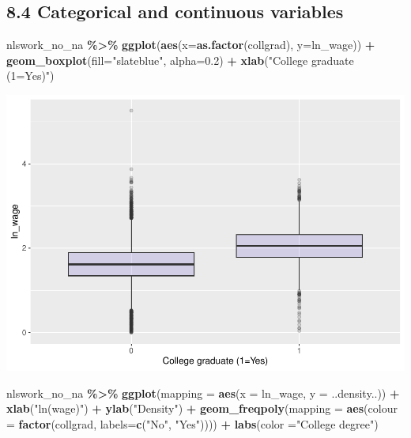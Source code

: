 \documentclass[
]{article}
\newenvironment{Shaded}{\begin{snugshade}}{\end{snugshade}}
\newcommand{\AttributeTok}[1]{\textcolor[rgb]{0.13,0.29,0.53}{#1}}
\newcommand{\FloatTok}[1]{\textcolor[rgb]{0.00,0.00,0.81}{#1}}
\newcommand{\FunctionTok}[1]{\textcolor[rgb]{0.13,0.29,0.53}{\textbf{#1}}}
\newcommand{\NormalTok}[1]{#1}
\newcommand{\SpecialCharTok}[1]{\textcolor[rgb]{0.81,0.36,0.00}{\textbf{#1}}}
\newcommand{\StringTok}[1]{\textcolor[rgb]{0.31,0.60,0.02}{#1}}
\begin{document}
\hypertarget{categorical-and-continuous-variables}{%
\subsection{8.4 Categorical and continuous
variables}\label{categorical-and-continuous-variables}}

\begin{Shaded}
\begin{Highlighting}[]
\NormalTok{nlswork\_no\_na }\SpecialCharTok{\%\textgreater{}\%} \FunctionTok{ggplot}\NormalTok{(}\FunctionTok{aes}\NormalTok{(}\AttributeTok{x=}\FunctionTok{as.factor}\NormalTok{(collgrad), }\AttributeTok{y=}\NormalTok{ln\_wage)) }\SpecialCharTok{+}
  \FunctionTok{geom\_boxplot}\NormalTok{(}\AttributeTok{fill=}\StringTok{"slateblue"}\NormalTok{, }\AttributeTok{alpha=}\FloatTok{0.2}\NormalTok{) }\SpecialCharTok{+} 
  \FunctionTok{xlab}\NormalTok{(}\StringTok{"College graduate (1=Yes)"}\NormalTok{)}
\end{Highlighting}
\end{Shaded}

\includegraphics{RIntro_files/figure-latex/unnamed-chunk-22-1.pdf}

\begin{Shaded}
\begin{Highlighting}[]
\NormalTok{nlswork\_no\_na }\SpecialCharTok{\%\textgreater{}\%} \FunctionTok{ggplot}\NormalTok{(}\AttributeTok{mapping =} \FunctionTok{aes}\NormalTok{(}\AttributeTok{x =}\NormalTok{ ln\_wage, }\AttributeTok{y =}\NormalTok{ ..density..)) }\SpecialCharTok{+}
    \FunctionTok{xlab}\NormalTok{(}\StringTok{"ln(wage)"}\NormalTok{) }\SpecialCharTok{+}
    \FunctionTok{ylab}\NormalTok{(}\StringTok{"Density"}\NormalTok{) }\SpecialCharTok{+}
    \FunctionTok{geom\_freqpoly}\NormalTok{(}\AttributeTok{mapping =} \FunctionTok{aes}\NormalTok{(}\AttributeTok{colour =} \FunctionTok{factor}\NormalTok{(collgrad, }\AttributeTok{labels=}\FunctionTok{c}\NormalTok{(}\StringTok{"No"}\NormalTok{, }\StringTok{"Yes"}\NormalTok{)))) }\SpecialCharTok{+}
  \FunctionTok{labs}\NormalTok{(}\AttributeTok{color =}\StringTok{"College degree"}\NormalTok{)}
\end{Highlighting}
\end{Shaded}
\end{document}
